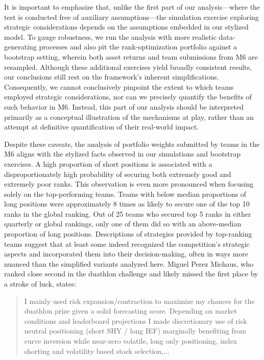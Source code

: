 \documentclass[3p,times,twocolumn]{elsarticle}
\begin{document}
It is important to emphasize that, unlike the first part of our analysis—where the test is conducted free of auxiliary assumptions—the simulation exercise exploring strategic considerations depends on the assumptions embedded in our stylized model.
To gauge robustness, we run the analysis with more realistic data-generating processes and also pit the rank-optimization portfolio against a bootstrap setting, wherein both asset returns and team submissions from M6 are resampled.
Although these additional exercises yield broadly consistent results, our conclusions still rest on the framework’s inherent simplifications. 
Consequently, we cannot conclusively pinpoint the extent to which teams employed strategic considerations, nor can we precisely quantify the benefits of such behavior in M6. 
Instead, this part of our analysis should be interpreted primarily as a conceptual illustration of the mechanisms at play, rather than an attempt at definitive quantification of their real-world impact.

Despite these caveats, the analysis of portfolio weights submitted by teams in the M6 aligns with the stylized facts observed in our simulations and bootstrap exercises. 
A high proportion of short positions is associated with a disproportionately high probability of securing both extremely good and extremely poor ranks.
This observation is even more pronounced when focusing solely on the top-performing teams.
Teams with below median proportions of long positions were approximately 8 times as likely to secure one of the top 10 ranks in the global ranking.
Out of 25 teams who secured top 5 ranks in either quarterly or global rankings, only one of them did so with an above-median proportion of long positions.
Descriptions of strategies provided by top-ranking teams suggest that at least some indeed recognized the competition's strategic aspects and incorporated them into their decision-making, often in ways more nuanced than the simplified variants analyzed here.
Miguel Perez Michaus, who ranked close second in the duathlon challenge and likely missed the first place by a stroke of luck, states:
\begin{quote}
    I mainly used risk expansion/contraction to maximize my chances for the duathlon prize given a solid forecasting score.
    Depending on market conditions and leaderboard projections I made discretionary use of risk neutral positioning (short SHY / long IEF) marginally benefiting from curve inversion while near-zero volatile, long only positioning, index shorting and volatility based stock selection,...\citep{michausFinQBoostMachineLearning2023}
\end{quote}
\end{document}
